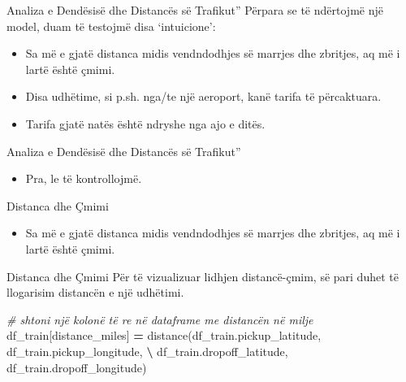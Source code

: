 \documentclass[
  ignorenonframetext,
]{beamer}
\newenvironment{Shaded}{\begin{snugshade}}{\end{snugshade}}
\newcommand{\CommentTok}[1]{\textcolor[rgb]{0.56,0.35,0.01}{\textit{#1}}}
\newcommand{\NormalTok}[1]{#1}
\newcommand{\OperatorTok}[1]{\textcolor[rgb]{0.81,0.36,0.00}{\textbf{#1}}}
\newcommand{\StringTok}[1]{\textcolor[rgb]{0.31,0.60,0.02}{#1}}
\providecommand{\tightlist}{%
  \setlength{\itemsep}{0pt}\setlength{\parskip}{0pt}}
\begin{document}
\begin{frame}{Analiza e Dendësisë dhe Distancës së Trafikut''}
\protect\hypertarget{analiza-e-denduxebsisuxeb-dhe-distancuxebs-suxeb-trafikut}{}
Përpara se të ndërtojmë një model, duam të testojmë disa `intuicione':

\begin{itemize}
\item
  Sa më e gjatë distanca midis vendndodhjes së marrjes dhe zbritjes, aq
  më i lartë është çmimi.
\item
  Disa udhëtime, si p.sh. nga/te një aeroport, kanë tarifa të
  përcaktuara.
\item
  Tarifa gjatë natës është ndryshe nga ajo e ditës.
\end{itemize}
\end{frame}

\begin{frame}{Analiza e Dendësisë dhe Distancës së Trafikut''}
\protect\hypertarget{analiza-e-denduxebsisuxeb-dhe-distancuxebs-suxeb-trafikut-1}{}
\begin{itemize}
\tightlist
\item
  Pra, le të kontrollojmë.
\end{itemize}
\end{frame}

\begin{frame}{Distanca dhe Çmimi}
\protect\hypertarget{distanca-dhe-uxe7mimi}{}
\begin{itemize}
\tightlist
\item
  Sa më e gjatë distanca midis vendndodhjes së marrjes dhe zbritjes, aq
  më i lartë është çmimi.
\end{itemize}
\end{frame}

\begin{frame}[fragile]{Distanca dhe Çmimi}
\protect\hypertarget{distanca-dhe-uxe7mimi-1}{}
Për të vizualizuar lidhjen distancë-çmim, së pari duhet të llogarisim
distancën e një udhëtimi.


\begin{Shaded}
\begin{Highlighting}[]
\CommentTok{\# shtoni një kolonë të re në dataframe me distancën në milje}
\NormalTok{df\_train[}\StringTok{\textquotesingle{}distance\_miles\textquotesingle{}}\NormalTok{] }\OperatorTok{=}\NormalTok{ distance(df\_train.pickup\_latitude, df\_train.pickup\_longitude, }\OperatorTok{\textbackslash{}}
\NormalTok{                                      df\_train.dropoff\_latitude, df\_train.dropoff\_longitude)}
\end{Highlighting}
\end{Shaded}
\end{frame}
\end{document}
